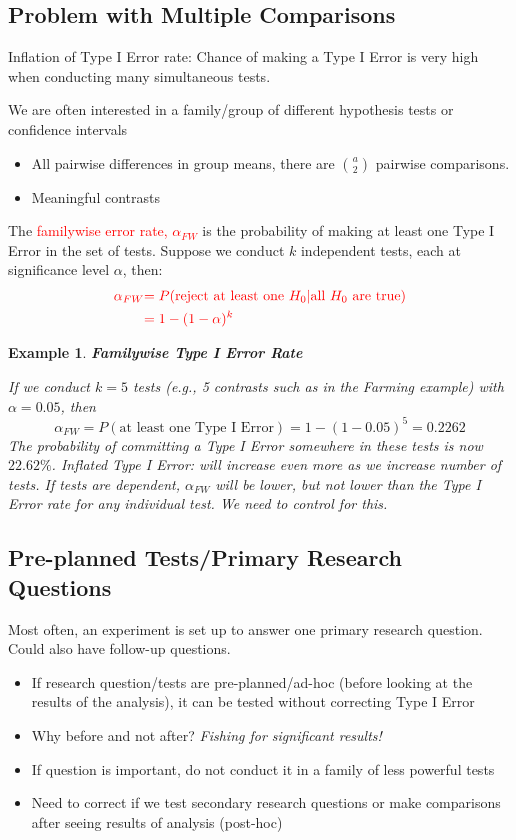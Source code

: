 \documentclass[a4paper,11pt]{article}
\newtheorem{eg}[thm]{Example}
\begin{document}
\subsection{Problem with Multiple Comparisons}
Inflation of Type I Error rate: Chance of making a Type I Error is very high when conducting many simultaneous tests. 

We are often interested in a family/group of different hypothesis tests or confidence intervals
\begin{itemize}
\item All pairwise differences in group means, there are ${a\choose 2}$ pairwise comparisons.
\item Meaningful contrasts
\end{itemize}
The \textcolor{red}{familywise error rate, $\alpha_{FW}$} is the probability of making at least one Type I Error in the set of tests. Suppose we conduct $k$ independent tests, each at significance level $\alpha$, then: 
\begin{align*}
\textcolor{red}{\alpha_{FW}}&\textcolor{red}{=P(\text{reject at least one $H_0|$all $H_0$ are true})}\\
&\textcolor{red}{=1-(1-\alpha)^k}
\end{align*}
\begin{eg}
\normalfont
\textbf{Familywise Type I Error Rate}

If we conduct $k=5$ tests (e.g., 5 contrasts such as in the Farming example) with $\alpha=0.05$, then
$$\alpha_{FW}=P(\text{at least one Type I Error})=1-(1-0.05)^5=0.2262$$
The probability of committing a Type I Error somewhere in these tests is now $22.62\%$. Inflated Type I Error: will increase even more as we increase number of tests. If tests are dependent, $\alpha_{FW}$ will be lower, but not lower than the Type I Error rate for any individual test. We need to control for this. 
\end{eg}

\subsection{Pre-planned Tests/Primary Research Questions}
Most often, an experiment is set up to answer one primary research question. Could also have follow-up questions. 
\begin{itemize}
\item If research question/tests are pre-planned/ad-hoc (before looking at the results of the analysis), it can be tested without correcting Type I Error
\item Why before and not after? \textit{Fishing for significant results!}
\item If question is important, do not conduct it in a family of less powerful tests
\item Need to correct if we test secondary research questions or make comparisons after seeing results of analysis (post-hoc)
\end{itemize}
\end{document}
